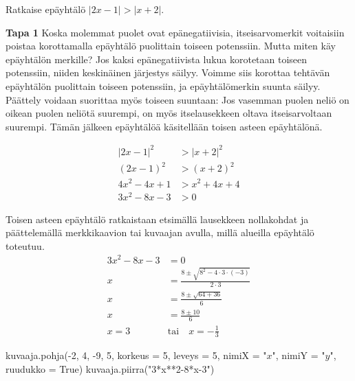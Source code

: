 \begin{esimerkki} Ratkaise epäyhtälö $|2x-1|>|x+2|$.

\begin{esimratk} \textbf{Tapa 1} Koska molemmat puolet ovat epänegatiivisia, itseisarvomerkit voitaisiin poistaa korottamalla epäyhtälö puolittain 		toiseen potenssiin. Mutta miten käy epäyhtälön merkille? Jos kaksi epänegatiivista lukua korotetaan toiseen potenssiin, niiden keskinäinen järjestys säilyy. Voimme siis korottaa tehtävän epäyhtälön puolittain toiseen potenssiin, ja epäyhtälömerkin suunta säilyy. Päättely voidaan suorittaa myös toiseen suuntaan: Jos vasemman puolen neliö on oikean puolen neliötä suurempi, on myös itselausekkeen oltava itseisarvoltaan suurempi. Tämän jälkeen epäyhtälöä käsitellään toisen asteen epäyhtälönä.

\begin{align*}
|2x-1|^2 & >|x+2|^2 \\
(2x-1)^2 & >(x+2)^2 \\
4x^2-4x+1 & >x^2+4x+4 \\
3x^2-8x-3 & >0
\end{align*}

Toisen asteen epäyhtälö ratkaistaan etsimällä lausekkeen nollakohdat ja päättelemällä merkkikaavion tai kuvaajan avulla, millä alueilla epäyhtälö toteutuu.
\begin{align*}
3x^2-8x-3 & =0 \\
x & =\frac{8\pm\sqrt{8^2-4\cdot3\cdot(-3)}}{2\cdot 3} \\
x & =\frac{8\pm\sqrt{64+36}}{6} \\
x & =\frac{8\pm 10}{6} \\
x=3 \quad & \text{tai} \quad x=-\frac{1}{3}
\end{align*}

\begin{merkkikaavio}{2}

	\merkkikaavioMerkki{$+$}
	\merkkikaavioMerkki{$-$}
	\merkkikaavioMerkki{$+$}

\end{merkkikaavio}
\begin{kuva}
  kuvaaja.pohja(-2, 4,  -9, 5, korkeus = 5, leveys = 5, nimiX = "$x$", nimiY = "$y$", ruudukko = True)
  kuvaaja.piirra("3*x**2-8*x-3")
\end{kuva}


\end{esimratk}
\end{esimerkki}
